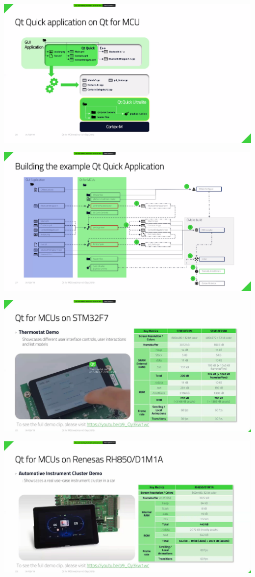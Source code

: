 \documentclass[11pt]{article}
\begin{document}
\begin{center}
\includegraphics[width=.9\linewidth]{gorseller/qt5.png}
\end{center}
\begin{center}
\includegraphics[width=.9\linewidth]{gorseller/qt6.png}
\end{center}
\begin{center}
\includegraphics[width=.9\linewidth]{gorseller/qt7.png}
\end{center}
\begin{center}
\includegraphics[width=.9\linewidth]{gorseller/qt8.png}
\end{center}
\end{document}
